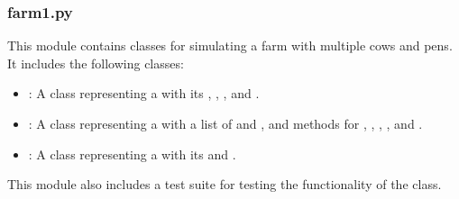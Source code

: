 \documentclass[letterpaper,10pt,english]{sphinxmanual}
\begin{document}
\subsubsection{farm1.py}
\label{\detokenize{farming:farm1-py}}
\sphinxAtStartPar
This module contains classes for simulating a farm with multiple cows and pens.
It includes the following classes:
\begin{itemize}
\item {} 
\sphinxAtStartPar
{\hyperref[\detokenize{farming:farming.farm1.Cow}]{}}: A class representing a  with its , , , and .

\item {} 
\sphinxAtStartPar
{\hyperref[\detokenize{farming:farming.farm1.Farm}]{}}: A class representing a  with a list of  and , and methods for ,
, , , and .

\item {} 
\sphinxAtStartPar
{\hyperref[\detokenize{farming:farming.farm1.Pen}]{}}: A class representing a  with its  and .

\end{itemize}

\sphinxAtStartPar
This module also includes a test suite for testing the functionality of the {\hyperref[\detokenize{farming:farming.farm1.Farm}]{}} class.
\end{document}
